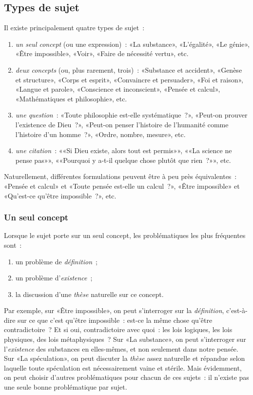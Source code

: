 \documentclass[a4paper,11pt]{article}
\newcommand{\cad}{c'est-à-dire}
\begin{document}
\subsection{Types de sujet}

Il existe principalement quatre types de sujet~: 
\begin{enumerate}
\item \emph{un seul concept} (ou une expression)~: «La substance»,
  «L'égalité», «Le génie», «Être impossible», «Voir», «Faire de
  nécessité vertu», etc.
\item \emph{deux concepts} (ou, plus rarement, trois)~: «Substance et
  accident», «Genèse et structure», «Corps et esprit», «Convaincre et
  persuader», «Foi et raison», «Langue et parole», «Conscience et
  inconscient», «Pensée et calcul», «Mathématiques et philosophie», etc.
\item \emph{une question}~: «Toute philosophie est-elle systématique~?»,
  «Peut-on prouver l'existence de Dieu~?», «Peut-on penser l'histoire de
  l'humanité comme l'histoire d'un homme~?», «Ordre, nombre, mesure»,
  etc.
\item \emph{une citation}~: ««Si Dieu existe, alors tout est permis»»,
  ««La science ne pense pas»», ««Pourquoi y a-t-il quelque chose plutôt
  que rien~?»», etc.
\end{enumerate}
Naturellement, différentes formulations peuvent être à peu près
équivalentes~: «Pensée et calcul» et «Toute pensée est-elle un
calcul~?», «Être impossible» et «Qu'est-ce qu'être impossible~?», etc.



\subsubsection{Un seul concept}

Lorsque le sujet porte sur un seul concept, les problématiques les plus
fréquentes sont~:
\begin{enumerate}
\item un problème de \emph{définition}~;
\item un problème d'\emph{existence}~;
\item la discussion d'une \emph{thèse} naturelle sur ce concept.
\end{enumerate}
Par exemple, sur «Être impossible», on peut s'interroger sur la
\emph{définition}, \cad{} sur ce que c'est qu'être impossible~: est-ce
la même chose qu'être contradictoire~?  Et si oui, contradictoire avec
quoi~: les lois logiques, les lois physiques, des lois métaphysiques~?
Sur «La substance», on peut s'interroger sur l'\emph{existence} des
substances en elles-mêmes, et non seulement dans notre pensée. Sur «La
spéculation», on peut discuter la \emph{thèse} assez naturelle et
répandue selon laquelle toute spéculation est nécessairement vaine et
stérile. Mais évidemment, on peut choisir d'autres problématiques pour
chacun de ces sujets~: il n'existe pas une seule bonne problématique par
sujet.
\end{document}

